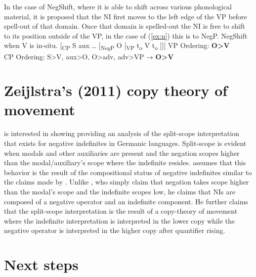 \documentclass[12pt, letterpaper]{article}
\begin{document}
In the case of NegShift, where it is able to shift across various phonological material, it is proposed that the NI first moves to the left edge of the VP before spell-out of that domain. Once that domain is spelled-out the NI is free to shift to its position outside of the VP, in the case of (\ref{ex:n}) this is to NegP.
	\ea NegShift when V is in-situ. \label{ex:n}
	\vspace{6pt}
		\ea {}[\textsubscript{CP} S aux … [\textsubscript{NegP} O [\textsubscript{VP} t\textsubscript{o}  V t\textsubscript{o} ]]]
		\ex VP Ordering: \textbf{O>V}\\
		CP Ordering: S>V, aux>O, O>adv, adv>VP → \textbf{O>V}
		\z 
	\z

\section{Zeijlstra's (2011) copy theory of movement} \label{sec:ZEIJLSTRA}

\citet{zeijlstraSyntacticallyComplexStatus2011} is interested in showing providing an analysis of the split-scope interpretation that exists for negative indefinites in Germanic languages. Split-scope is evident when modals and other auxiliaries are present and the negation scopes higher than the modal/auxiliary's scope where the indefinite resides. \citeauthor{zeijlstraSyntacticallyComplexStatus2011} assumes that this behavior is the result of the compositional status of negative indefinites similar to the claims made by \citet{iatridouNegativeDPsAMovement2011}. Unlike \citeauthor{iatridouNegativeDPsAMovement2011}, who simply claim that negation takes scope higher than the modal's scope and the indefinite scopes low, he claims that NIs are composed of a negative operator and an indefinite component. He further claims that the split-scope interpretation is the result of a copy-theory of movement where the indefinite interpretation is interpreted in the lower copy while the negative operator is interpreted in the higher copy after quantifier rising. 

\section{Next steps} \label{sec:NEXT}
\end{document}
